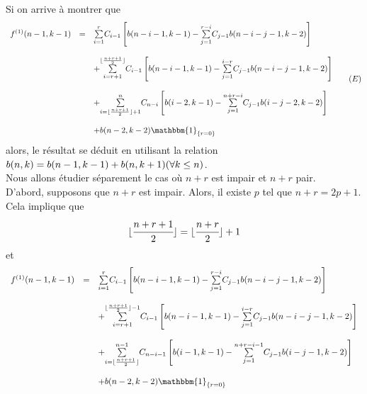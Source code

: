 Si on arrive à montrer que
$$
	\begin{array} {l l l}
		f^{(1)}(n-1,k-1) & =       & \underset{i=1}{\overset{r}{\sum}}C_{i-1}\left[b(n-i-1,k-1)-\underset{j=1}{\overset{r-i}{\sum}}C_{j-1}b(n-i-j-1,k-2)\right]                               \\ &\text{ }&\\ &\text{}&+\underset{i=r+1}{\overset{\lfloor \frac{n+r+1}{2}\rfloor}{\sum}}C_{i-1}\left[b(n-i-1,k-1)-\underset{j=1}{\overset{i-r}{\sum}}C_{j-1}b(n-i-j-1,k-2)\right]\\ &\text{ }&\\
		                 & \text{} & +\underset{i=\lfloor \frac{n+r+1}{2}\rfloor+1}{\overset{n}{\sum}}C_{n-i}\left[b(i-2,k-1)-\underset{j=1}{\overset{n+r-i}{\sum}}C_{j-1}b(i-j-2,k-2)\right] \\ &\text{ }&\\
		                 & \text{} & +b(n-2,k-2)\mathbbm{1}_{\{r = 0\}}
	\end{array} \hspace{15pt}(E)
$$
alors, le résultat se déduit en utilisant la relation $b(n, k) = b(n-1, k-1) + b(n, k+1) \\(\forall k\leq n)$.
\vspace{10pt}\\
Nous allons étudier séparement le cas où $n+r$ est impair et $n+r$ pair.\\
D'abord, supposons que $n + r$ est impair. Alors, il existe $p$ tel que $n+r=2p+1$.\\
Cela implique que $$\lfloor \cfrac{n+r+1}{2}\rfloor = \lfloor \cfrac{n+r}{2} \rfloor +1$$ et
\[
	\begin{array} {l l l}
		f^{(1)}(n-1,k-1) & =        & \underset{i=1}{\overset{r}{\sum}}C_{i-1}\left[b(n-i-1,k-1)-\underset{j=1}{\overset{r-i}{\sum}}C_{j-1}b(n-i-j-1,k-2)\right]                                   \\ &\text{ }&\\ &\text{ }&+\underset{i=r+1}{\overset{\lfloor \frac{n+r+1}{2}\rfloor -1}{\sum}}C_{i-1}\left[b(n-i-1,k-1)-\underset{j=1}{\overset{i-r}{\sum}}C_{j-1}b(n-i-j-1,k-2)\right]\\ &\text{ }&\\
		                 & \text{ } & +\underset{i=\lfloor \frac{n+r+1}{2}\rfloor}{\overset{n-1}{\sum}}C_{n-i-1}\left[b(i-1,k-1)-\underset{j=1}{\overset{n+r-i-1}{\sum}}C_{j-1}b(i-j-1,k-2)\right] \\ &\text{ }&\\
		                 & \text{ } & +b(n-2,k-2)\mathbbm{1}_{\{r = 0\}}                                                                                                                           \\
	\end{array}
\]

